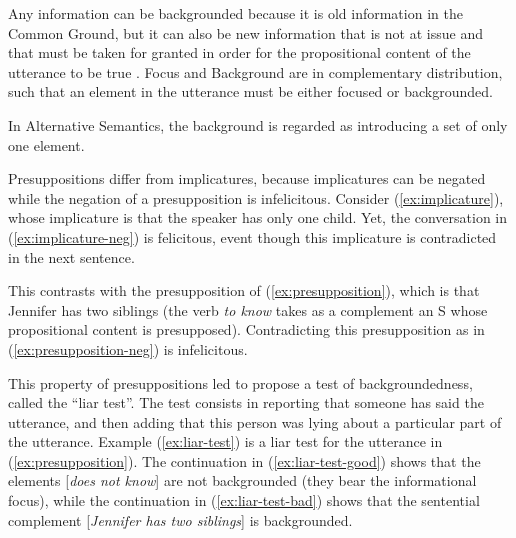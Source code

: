 Any information can be backgrounded because it is old information in the Common Ground, but it can also be new information that is not at issue and that must be taken for granted in order for the propositional content of the utterance to be true \citep[54]{Lambrecht.1994}. Focus and Background are in complementary distribution, such that an element in the utterance must be either focused or backgrounded. 

In Alternative Semantics, the background is regarded as introducing a set of only one element. 

Presuppositions differ from implicatures, because implicatures can be negated while the negation of a presupposition is infelicitous. Consider (\ref{ex:implicature}), whose implicature is that the speaker has only one child. Yet, the conversation in (\ref{ex:implicature-neg}) is felicitous, event though this implicature is contradicted in the next sentence.

\eal 
{} \label{ex:implicature}
 \label{ex:implicature-neg}
\zl 

This contrasts with the presupposition of (\ref{ex:presupposition}), which is that Jennifer has two siblings (the verb \emph{to know} takes as a complement an S whose propositional content is presupposed). Contradicting this presupposition as in (\ref{ex:presupposition-neg}) is infelicitous.

\eal 
{} \label{ex:presupposition}
 \label{ex:presupposition-neg}
\zl 

This property of presuppositions led \citet{Erteschik-Shir.1973} to propose a test of backgroundedness, called the ``liar test''. The test consists in reporting that someone has said the utterance, and then adding that this person was lying about a particular part of the utterance. Example (\ref{ex:liar-test}) is a liar test for the utterance in (\ref{ex:presupposition}). The continuation in (\ref{ex:liar-test-good}) shows that the elements [\emph{does not know}] are not backgrounded (they bear the informational focus), while the continuation in (\ref{ex:liar-test-bad}) shows that the sentential complement [\emph{Jennifer has two siblings}] is backgrounded. 

